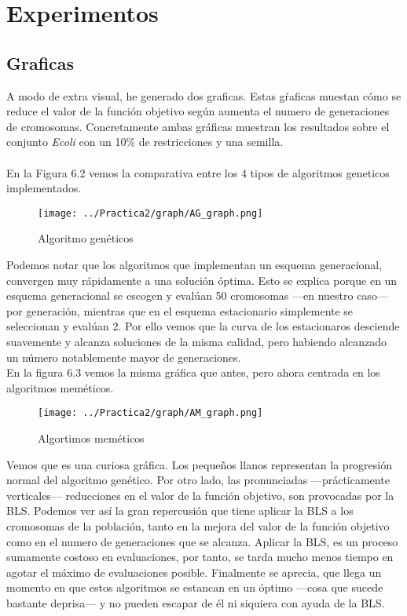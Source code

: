 \newpage

\section{Experimentos}
\subsection{Graficas}
A modo de extra visual, he generado dos graficas. Estas gŕaficas muestan cómo se reduce el valor de la función objetivo según aumenta el numero de generaciones de cromosomas. Concretamente ambas gráficas muestran los resultados sobre el conjunto \emph{Ecoli} con un 10\% de restricciones y una semilla.\\
\\
En la Figura 6.2 vemos la comparativa entre los 4 tipos de algoritmos geneticos implementados.
\begin{figure}[H]
   \centering
   \texttt{[image: ../Practica2/graph/AG\_graph.png]}
   \caption{Algoritmo genéticos}
\end{figure}
Podemos notar que los algoritmos que implementan un esquema generacional, convergen muy rápidamente a una solución óptima. Esto se explica porque en un esquema generacional se escogen y evalúan 50 cromosomas ---en nuestro caso--- por generación, mientras que en el esquema estacionario simplemente se seleccionan y evalúan 2. Por ello vemos que la curva de los estacionaros desciende suavemente y alcanza soluciones de la misma calidad, pero habiendo alcanzado un número notablemente mayor de generaciones.\\
\newpage
En la figura 6.3 vemos la misma gráfica que antes, pero ahora centrada en los algoritmos meméticos.
\begin{figure}[H]
   \centering
   \texttt{[image: ../Practica2/graph/AM\_graph.png]}
   \caption{Algortimos meméticos}
\end{figure}

Vemos que es una curiosa gráfica. Los pequeños llanos representan la progresión normal del algoritmo genético. Por otro lado, las pronunciadas ---prácticamente verticales--- reducciones en el valor de la función objetivo, son provocadas por la BLS. Podemos ver así la gran repercusión que tiene aplicar la BLS a los cromosomas de la población, tanto en la mejora del valor de la función objetivo como en el numero de generaciones que se alcanza. Aplicar la BLS, es un proceso sumamente costoso en evaluaciones, por tanto, se tarda mucho menos tiempo en agotar el máximo de evaluaciones posible. Finalmente se aprecia, que llega un momento en que estos algoritmos se estancan en un óptimo ---cosa que sucede bastante deprisa--- y no pueden escapar de él ni siquiera con ayuda de la BLS.

